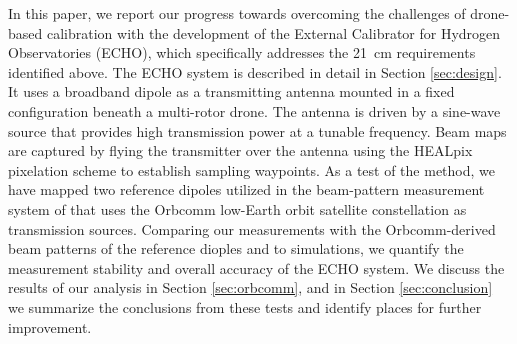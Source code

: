 \documentclass[preprint2,numberedappendix,tighten,twocolappendix]{aastex6}
\begin{document}
In this paper, we report our progress towards overcoming the challenges of drone-based calibration with the development of the External Calibrator for Hydrogen Observatories (ECHO), which specifically addresses the 21~cm requirements identified above.  The ECHO system is described in detail in Section \ref{sec:design}.  It uses a broadband dipole as a transmitting antenna mounted in a fixed configuration beneath a multi-rotor drone. The antenna is driven by a sine-wave source that provides high transmission power at a tunable frequency. Beam maps are captured by flying the transmitter over the antenna using the HEALpix pixelation scheme to establish sampling waypoints.  As a test of the method, we have mapped two reference dipoles utilized in the beam-pattern measurement system of \citet{2016:NebenHERAdish} that uses the Orbcomm low-Earth orbit satellite constellation as transmission sources.  Comparing our measurements with the Orbcomm-derived beam patterns of the reference dioples and to simulations, we quantify the measurement stability and overall accuracy of the ECHO system.  We discuss the results of our analysis in Section \ref{sec:orbcomm}, and in Section \ref{sec:conclusion} we summarize the conclusions from these tests and identify places for further improvement.



\end{document}
